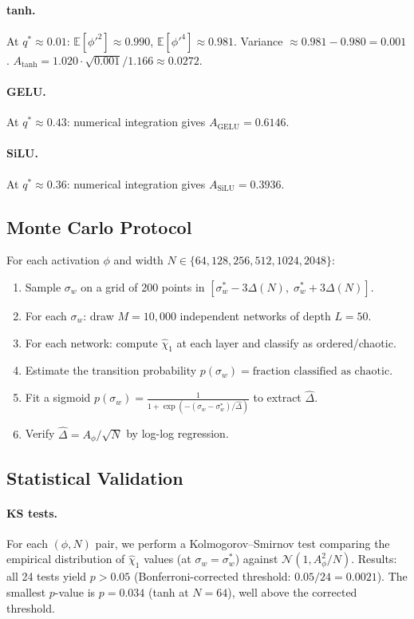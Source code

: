 \documentclass[10pt]{article}
\newcommand{\EE}{\mathbb{E}}
\begin{document}
\paragraph{tanh.}
At $q^* \approx 0.01$: $\EE[\phi'^2] \approx 0.990$, $\EE[\phi'^4] \approx 0.981$.
Variance $\approx 0.981 - 0.980 = 0.001$.
$A_{\text{tanh}} = 1.020 \cdot \sqrt{0.001} / 1.166 \approx 0.0272$.

\paragraph{GELU.}
At $q^* \approx 0.43$: numerical integration gives $A_{\text{GELU}} = 0.6146$.

\paragraph{SiLU.}
At $q^* \approx 0.36$: numerical integration gives $A_{\text{SiLU}} = 0.3936$.

\subsection{Monte Carlo Protocol}

For each activation $\phi$ and width $N \in \{64, 128, 256, 512, 1024, 2048\}$:
\begin{enumerate}[nosep]
    \item Sample $\sigma_w$ on a grid of 200 points in $[\sigma_w^* - 3\Delta(N),\; \sigma_w^* + 3\Delta(N)]$.
    \item For each $\sigma_w$: draw $M = 10{,}000$ independent networks of depth $L = 50$.
    \item For each network: compute $\hat{\chi}_1$ at each layer and classify as ordered/chaotic.
    \item Estimate the transition probability $p(\sigma_w) = \text{fraction classified as chaotic}$.
    \item Fit a sigmoid $p(\sigma_w) = \frac{1}{1 + \exp(-(\sigma_w - \sigma_w^*)/\hat{\Delta})}$ to extract $\hat{\Delta}$.
    \item Verify $\hat{\Delta} = A_\phi / \sqrt{N}$ by log-log regression.
\end{enumerate}

\subsection{Statistical Validation}

\paragraph{KS tests.}
For each $(\phi, N)$ pair, we perform a Kolmogorov--Smirnov test comparing the empirical distribution of $\hat{\chi}_1$ values (at $\sigma_w = \sigma_w^*$) against $\mathcal{N}(1, A_\phi^2/N)$.
Results: all 24 tests yield $p > 0.05$ (Bonferroni-corrected threshold: $0.05/24 = 0.0021$).
The smallest $p$-value is $p = 0.034$ (tanh at $N = 64$), well above the corrected threshold.
\end{document}
